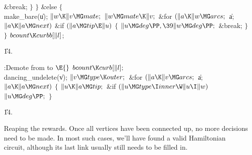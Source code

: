 \&{break};\6
\4${}\}{}$\2\2\6
\4${}\}{}$\5
\2\&{else}\5
${}\{{}$\1\6
\\{make\_bare}(\|u);\6
${}\|w\K\|v\MG\\{mate};{}$\6
${}\|w\MG\\{mate}\K\|v;{}$\6
\&{for} ${}(\|a\K\|w\MG\\{arcs};{}$ \|a; ${}\|a\K\|a\MG\\{next}){}$\1\6
\&{if} ${}(\|a\MG\\{tip}\E\|u){}$\5
${}\{{}$\1\6
${}\|u\MG\\{deg}\PP,\39\|w\MG\\{deg}\PP;{}$\6
\&{break};\6
\4${}\}{}$\2\2\6
\4${}\}{}$\2\6
${}\\{bcount}\K\\{curbb}[\|l]{}$;\par
\U14.\fi

\B{}:Demote  from  to \X${}\E{}$\6
$\\{bcount}\K\\{curb}[\|l];{}$\6
\\{dancing\_undelete}(\|v);\6
${}\|v\MG\\{type}\K\\{outer};{}$\6
\&{for} ${}(\|a\K\|v\MG\\{arcs};{}$ \|a; ${}\|a\K\|a\MG\\{next}){}$\5
${}\{{}$\1\6
${}\|u\K\|a\MG\\{tip};{}$\6
\&{if} ${}(\|u\MG\\{type}\I\\{inner}\W\|u\I\|w){}$\1\5
${}\|u\MG\\{deg}\PP;{}$\2\6
\4${}\}{}$\2\par
\U14.\fi

Reaping the rewards. Once all vertices have been
connected up,
no more decisions need to be made. In most such cases, we'll have found a
valid Hamiltonian circuit, although its last link usually still needs
to be filled in.

